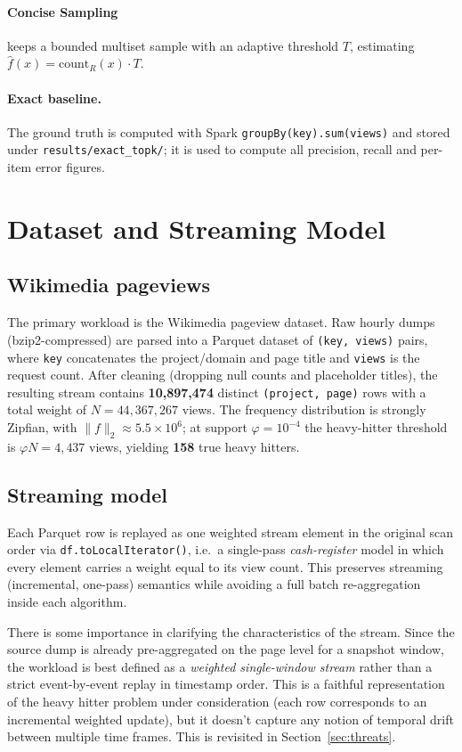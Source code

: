 \documentclass[12pt]{article}
\begin{document}
\paragraph{Concise Sampling} keeps a bounded multiset sample with an adaptive
threshold $T$, estimating $\hat f(x) = \text{count}_R(x)\cdot T$.
\paragraph{Exact baseline.} The ground truth is computed with Spark
\texttt{groupBy(key).sum(views)} and stored under \texttt{results/exact\_topk/};
it is used to compute all precision, recall and per-item error figures.

\section{Dataset and Streaming Model}
\label{sec:dataset}

\subsection{Wikimedia pageviews}

The primary workload is the Wikimedia pageview dataset. Raw hourly dumps
(bzip2-compressed) are parsed into a Parquet dataset of \texttt{(key, views)}
pairs, where \texttt{key} concatenates the project/domain and page title and
\texttt{views} is the request count. After cleaning (dropping null counts and
placeholder titles), the resulting stream contains
\textbf{10{,}897{,}474} distinct \texttt{(project, page)} rows with a total
weight of \textbf{$N = 44{,}367{,}267$} views. The frequency distribution is
strongly Zipfian, with $\lVert f\rVert_2 \approx 5.5\times10^6$; at support
$\varphi = 10^{-4}$ the heavy-hitter threshold is $\varphi N = 4{,}437$ views,
yielding \textbf{158} true heavy hitters.

\subsection{Streaming model}

Each Parquet row is replayed as one weighted stream element in the original scan
order via \texttt{df.toLocalIterator()}, i.e.\ a single-pass
\emph{cash-register} model in which every element carries a weight equal to its
view count. This preserves streaming (incremental, one-pass) semantics while
avoiding a full batch re-aggregation inside each algorithm.

There is some importance in clarifying the characteristics of the stream. Since the source dump is already pre-aggregated on the page level for a snapshot window, the workload is best defined as a \emph{weighted single-window stream} rather than a strict
event-by-event replay in timestamp order. This is a faithful representation of the heavy hitter problem under consideration (each row corresponds to an incremental weighted update), but it doesn’t capture any notion of temporal drift between multiple time frames. This is revisited in Section~\ref{sec:threats}.
\end{document}
